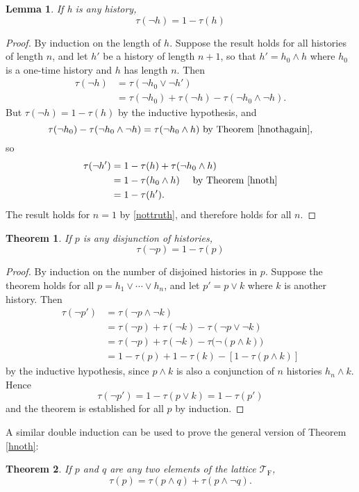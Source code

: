 \documentclass[12pt,a4paper,reqno]{article}
\newcommand{\upline}{\vspace{-1.2\abovedisplayskip}}
\renewcommand{\(}{\left(}
\renewcommand{\)}{\right)}
\newcommand{\TF}{\mathcal{T}_\text{F}}
\newcommand{\<}{\langle}
\renewcommand{\>}{\rangle}
\theoremstyle{plain} %
\newtheorem{thm}{Theorem}
\newtheorem{lemma}{Lemma}
\begin{document}
\begin{lemma}
If h is any history,
\[
\tau(\lnot h) = 1 - \tau(h)
\]
\end{lemma}
\begin{proof}
By induction on the length of $h$. Suppose the result holds for all histories of length $n$, and let $h'$ be a history of length $n+1$, so that $h' = h_0\land h$ where $h_0$ is a one-time history and $h$ has length $n$. Then
\begin{align*}
\tau(\lnot h) &= \tau(\lnot h_0\lor\lnot h')\\ 
&= \tau(\lnot h_0) + \tau(\lnot h) - \tau(\lnot h_0 \land\lnot h).
\end{align*}
But $\tau(\lnot h) = 1 - \tau(h)$ by the inductive hypothesis, and
\[
\tau(\lnot h_0) - \tau(\lnot h_0\land\lnot h) = \tau(\lnot h_0\land h) \text{ by Theorem \ref{hnothagain},}
\]
so\upline
\begin{align*}
\tau(\lnot h') &= 1 - \tau(h) + \tau(\lnot h_0\land h)\\
&= 1 - \tau(h_0\land h) \quad\text{ by Theorem \ref{hnoth}}\\
&= 1 - \tau(h').
\end{align*}
The result holds for $n = 1$ by \eqref{nottruth}, and therefore holds for all $n$.
\end{proof}

\begin{thm}
If $p$ is any disjunction of histories,
\[
\tau(\lnot p) = 1- \tau(p)
\]
\end{thm}
\begin{proof}
By induction on the number of disjoined histories in $p$. Suppose the theorem holds for all $p = h_1\lor\cdots\lor h_n$, and let $p' = p\lor k$ where $k$ is another history. Then
\begin{align*}
\tau(\lnot p') &= \tau(\lnot p \land \lnot k)\\
&= \tau(\lnot p) + \tau(\lnot k) - \tau(\lnot p\lor\lnot k)\\
&= \tau(\lnot p) + \tau(\lnot k) - \tau\big(\lnot(p\land k)\big)\\
&= 1 - \tau(p) + 1 - \tau(k) - [1 - \tau(p\land k)]
\end{align*}
by the inductive hypothesis, since $p\land k$ is also a conjunction of $n$ histories $h_n\land k$. Hence
\[
\tau(\lnot p') = 1 - \tau(p\lor k) = 1 - \tau(p')
\]
and the theorem is established for all $p$ by induction.
\end{proof}

A similar double induction can be used to prove the general version of Theorem \ref{hnoth}:
\begin{thm}\label{pnotq}
If $p$ and $q$ are any two elements of the lattice $\TF$,
\[
\tau(p) = \tau(p\land q) + \tau(p\land\lnot q).
\]
\end{thm}
\end{document}
